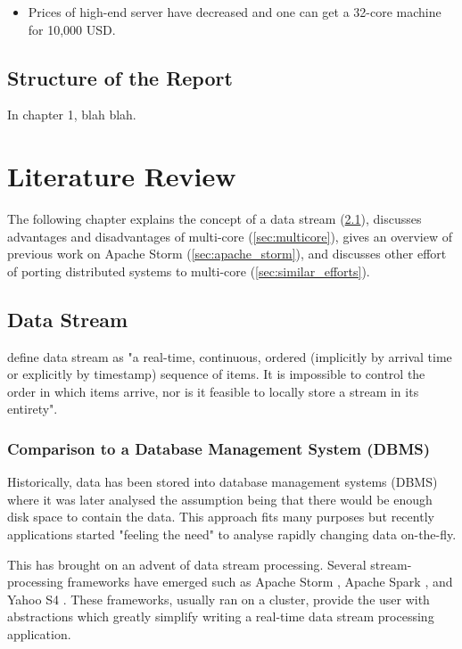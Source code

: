 \documentclass[bsc,logo,frontabs,twoside,singlespacing,normalheadings,parskip]{infthesis}\usepackage[]{graphicx}\usepackage[]{color}
\begin{document}
\begin{itemize}

	\item Prices of high-end server have decreased and one can get a 32-core machine for 10,000 USD.

\end{itemize}

\section{Structure of the Report}

In chapter 1, blah blah.
\clearpage{}

\clearpage{}\chapter{Literature Review}

The following chapter explains the concept of a data stream (\ref{sec:data_stream}), discusses advantages and disadvantages of multi-core (\ref{sec:multicore}), gives an overview of previous work on Apache Storm (\ref{sec:apache_storm}), and discusses other effort of porting distributed systems to multi-core (\ref{sec:similar_efforts}).

\section{Data Stream}
\label{sec:data_stream}

\citet{golab2003issues} define data stream as "a real-time, continuous, ordered (implicitly by arrival time or explicitly by timestamp) sequence of items. It is impossible to control the order in which items arrive, nor is it feasible to locally store a stream in its entirety".

\subsection{Comparison to a Database Management System (DBMS)}

Historically, data has been stored into database management systems (DBMS) where it was later analysed the assumption being that there would be enough disk space to contain the data. This approach fits many purposes but recently applications started "feeling the need" to analyse rapidly changing data on-the-fly.

This has brought on an advent of data stream processing. Several stream-processing frameworks have emerged such as Apache Storm \citep{ApacheStorm}, Apache Spark \citep{ApacheSpark}, and Yahoo S4 \citep{YahooS4}. These frameworks, usually ran on a cluster, provide the user with abstractions which greatly simplify writing a real-time data stream processing application.
\end{document}
